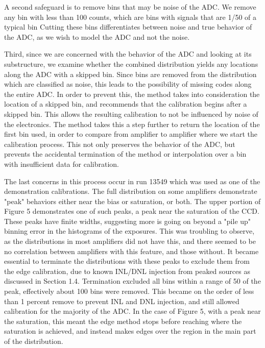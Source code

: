 \documentclass[11pt, letterpaper]{article}
\begin{document}
A second safeguard is to remove bins that may be noise of the ADC. 
We remove any bin with less than 100 counts, which are bins with signals that are 1/50 of a typical bin
Cutting these bins differentiates between noise and true behavior of the ADC, as we wish to model the ADC and not the noise. 
\indent


Third, since we are concerned with the behavior of the ADC and looking at its substructure, we examine whether the combined distribution yields any locations along the ADC with a skipped bin. 
Since bins are removed from the distribution which are classified as noise, this leads to the possibility of missing codes along the entire ADC. 
In order to prevent this, the method takes into consideration the location of a skipped bin, and recommends that the calibration begins after a skipped bin. 
This allows the resulting calibration to not be influenced by noise of the electronics. 
The method takes this a step further to return the location of the first bin used, in order to compare from amplifier to amplifier where we start the calibration process. 
This not only preserves the behavior of the ADC, but prevents the accidental termination of the method or interpolation over a bin with insufficient data for calibration. 
\indent 


The last concerns in this process occur in run 13549 which was used as one of the demonstration calibrations. 
The full distribution on some amplifiers demonstrate "peak" behaviors either near the bias or saturation, or both.
The upper portion of Figure 5 demonstrates one of such peaks, a peak near the saturation of the CCD.  
These peaks have finite widths, suggesting more is going on beyond a "pile up" binning error in the histograms of the exposures. 
This was troubling to observe, as the distributions in most amplifiers did not have this, and there seemed to be no correlation between amplifiers with this feature, and those without. 
It became essential to terminate the distributions with these peaks to exclude them from the edge calibration, due to known INL/DNL injection from peaked sources as discussed in Section 1.4. 
Termination excluded all bins within a range of 50 of the peak, effectively about 100 bins were removed. 
This became on the order of less than 1 percent remove to prevent INL and DNL injection, and still allowed calibration for the majority of the ADC. 
In the case of Figure 5, with a peak near the saturation, this meant the edge method stops before reaching where the saturation is achieved, and instead makes edges over the region in the main part of the distribution. 
\indent
\end{document}
